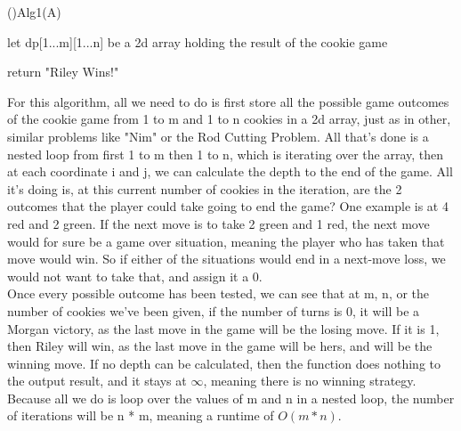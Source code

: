 \documentclass[11pt]{amsart}
\begin{document}
\begin{algorithm}[H]
    \Fn(){Alg1(A)}{
    \SetAlgoLined
    \SetNoFillComment
    \DontPrintSemicolon
        let dp[1...m][1...n] be a 2d array holding the result of the cookie game \\

        return "Riley Wins!"
    }
    \end{algorithm}
    \bigskip
\hspace*{15mm}For this algorithm, all we need to do is first store all the possible game outcomes of the cookie game from 1 to m and 1 to n cookies in a 2d array, just as in other, similar problems like "Nim" or the Rod Cutting Problem. All that's done is a nested loop from first 1 to m then 1 to n, which is iterating over the array, then at each coordinate i and j, we can calculate the depth to the end of the game. All it's doing is, at this current number of cookies in the iteration, are the 2 outcomes that the player could take going to end the game? One example is at 4 red and 2 green. If the next move is to take 2 green and 1 red, the next move would for sure be a game over situation, meaning the player who has taken that move would win. So if either of the situations would end in a next-move loss, we would not want to take that, and assign it a 0. \\
\hspace*{15mm}Once every possible outcome has been tested, we can see that at m, n, or the number of cookies we've been given, if the number of turns is 0, it will be a Morgan victory, as the last move in the game will be the losing move. If it is 1, then Riley will win, as the last move in the game will be hers, and will be the winning move. If no depth can be calculated, then the function does nothing to the output result, and it stays at $\infty$, meaning there is no winning strategy. Because all we do is loop over the values of m and n in a nested loop, the number of iterations will be n * m, meaning a runtime of $O(m * n)$.
\newpage
\end{document}
